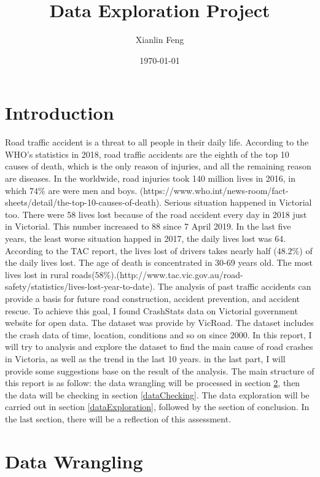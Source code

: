 \documentclass[11pt]{article}
\title{Data	Exploration Project}
\author{Xianlin Feng}
\date{\today}
\theoremstyle{definition}
\begin{document}
\maketitle

\section{Introduction}
Road traffic accident is a threat to all people in their daily life. According to the WHO's statistics in 2018, road traffic accidents are the eighth of the top 10 causes of death, which is the only reason of injuries, and all the remaining reason are diseases. In the worldwide, road injuries took 140 million lives in 2016, in which $74\%$ are were men and boys. (https://www.who.int/news-room/fact-sheets/detail/the-top-10-causes-of-death). Serious situation happened in Victorial too. There were 58 lives lost because of the road accident every day in 2018 just in Victorial. This number increased to 88 since 7 April 2019. In the last five years, the least worse situation happed in 2017, the daily lives lost was 64.  According to the TAC report, the lives lost of drivers takes nearly half ($48.2\%$) of the daily lives lost. The age of death is concentrated in 30-69 years old. The most lives lost in rural roads($58\%$).(http://www.tac.vic.gov.au/road-safety/statistics/lives-lost-year-to-date). The analysis of past traffic accidents can provide a basis for future road construction, accident prevention, and accident rescue. To achieve this goal, I found CrashStats data on Victorial government website for open data. The dataset was provide by VicRoad. The dataset includes the crash data of time, location, conditions and so on since 2000. In this report, I will try to analysis and explore the dataset to find the main cause of road crashes in Victoria, as well as the trend in the last 10 years. in the last part, I will provide some suggestions base on the result of the analysis. The main structure of this report is as follow: the data wrangling will be processed in section \ref{dataWrangling}, then the data will be checking in section \ref{dataChecking}. The data exploration will be carried out in section \ref{dataExploration}, followed by the section of conclusion. In the last section, there will be a reflection of this assessment. 
\par

\section{Data Wrangling} 
\label{dataWrangling}
\end{document}
